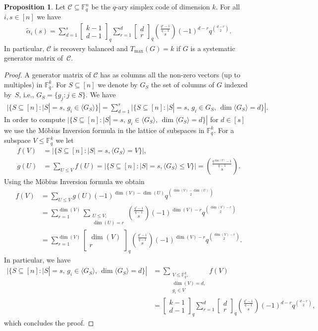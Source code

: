 \documentclass[11pt,a4paper,reqno,twoside]{amsart}
\theoremstyle{definition}
\newtheorem{proposition}{Proposition}
\newcommand{\F}{\mathbb{F}}
\newcommand{\mC}{\mathcal{C}}
\newcommand{\tmax}{T_{\max}}
\newcommand\qbin[3]{\left[\begin{matrix} #1 \\ #2 \end{matrix}\right]_{#3}}
\begin{document}
\begin{proposition}\label{prop:simpfi}
Let $\mC \subseteq \F_q^n$ be the $q$-ary simplex code of dimension $k$. For all $i,s \in [n]$ we have
\begin{align*}
    \widetilde{\alpha}_i(s) = \sum_{d=1}^{s}\qbin{k-1}{d-1}{q} \sum_{r=1}^d \qbin{d}{r}{q} \binom{\frac{q^r-1}{q-1}}{s}(-1)^{d-r}q^{\binom{d-r}{2}}.
\end{align*}
In particular, $\mC$ is recovery balanced and $\tmax(G)=k$ if $G$ is a systematic generator matrix of~$\mC$.
\end{proposition}
\begin{proof}
A generator matrix of $\mC$ has as columns all the non-zero vectors (up to multiples) in $\F_q^k$. For $S \subseteq [n]$ we denote by $G_S$ the set of columns of $G$ indexed by~$S$, i.e., $G_S = \{ g_j : j \in S\} $.
We have
\begin{align*}
     |\{S \subseteq [n] \colon |S|=s, \, g_i \in \langle G_S \rangle \}| = 
     \sum_{d=1}^s |\{S \subseteq [n] \colon |S|=s, \, g_i \in G_S, \, \dim \langle G_S \rangle  = d \}|.
\end{align*}
In order to compute $|\{S \subseteq [n] \colon |S|=s, \, g_i \in \langle G_S \rangle , \, \dim \langle G_S \rangle  = d \}|$ for $d \in [s]$ we use the Möbius Inversion formula in the lattice of subspaces in $\F_q^k$. For a subspace $V \le \F_q^k$ we let
\begin{align*}
    f(V) &= |\{S \subseteq [n] \colon |S|=s, \langle G_S \rangle  =V\}|, \\
    g(U) &= \sum_{U \le V} f(U) = |\{S \subseteq [n] \colon |S|=s, \langle G_S \rangle  \le V\}| =\binom{\frac{q^{\dim(V)}-1}{q-1}}{s}.
\end{align*}
Using the Möbius Inversion formula we obtain
\begin{align*}
 f(V) &= \sum_{U \le V} g(U)(-1)^{\dim(V)-\dim(U)}q^{\binom{\dim(V)-\dim(U)}{2}} \\
 &= \sum_{r=1}^{\dim(V)}\sum_{\substack{U \le V, \\ \dim(U)=r}} \binom{\frac{q^r-1}{q-1}}{s}(-1)^{\dim(V)-r}q^{\binom{\dim(V)-r}{2}} \\
  &=\sum_{r=1}^{\dim(V)}\qbin{\dim(V)}{r}{q} \binom{\frac{q^{r}-1}{q-1}}{s}(-1)^{\dim(V)-r}q^{\binom{\dim(V)-r}{2}}.  
\end{align*}
In particular, we have
\begin{align*}
    |\{S \subseteq [n] \colon |S|=s, \, g_i \in \langle G_S \rangle , \, \dim \langle G_S \rangle  = d \}|
    &= \sum_{\substack{V \le \F_q^k, \\ \dim(V)=d, \\ g_i \in V}} f(V) \\
    &= \qbin{k-1}{d-1}{q} \sum_{r=1}^d \qbin{d}{r}{q} \binom{\frac{q^{r}-1}{q-1}}{s}(-1)^{d-r}q^{\binom{d-r}{2}},
\end{align*}
which concludes the proof.    
\end{proof}
\end{document}
